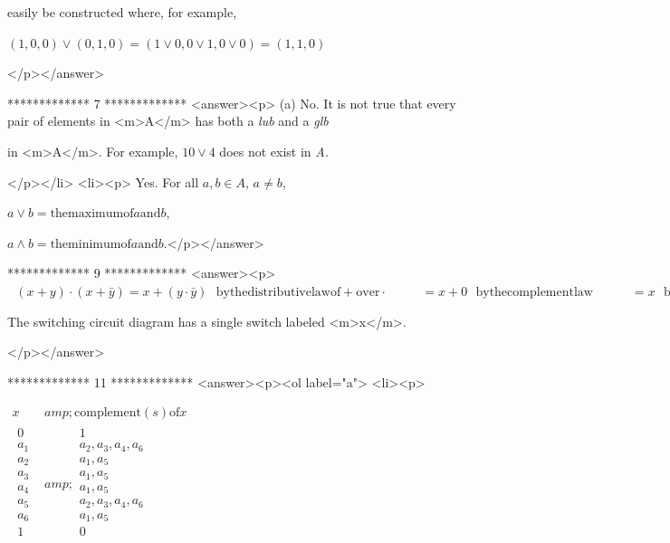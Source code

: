 easily be constructed where, for example,



 \((1, 0, 0) \lor  (0, 1, 0) = (1 \lor  0,0\lor 1,0\lor 0)=(1,1,0)\)

</p></answer>


*************
7
*************
<answer><p> (a) No. It is not true that every pair of elements in <m>A</m> has both a \textit{ lub} and a \textit{ glb}



in <m>A</m>.  For example, \(10 \lor  4\) does not exist in \textit{ A.}

</p></li>
<li><p>  Yes. For all \(a, b \in  A\), \(a \neq b\),



 \(a \lor  b = \text{the} \text{maximum} \text{of} a \text{and} b\),



 \(a \land  b = \text{the} \text{minimum} \text{of} a \text{and} b.\)</p></answer>


*************
9
*************
<answer><p> \(\text{            }(x + y) \cdot  \left(x + \bar{y}\right) =x + \left(y \cdot \bar{y}\right)\text{   }\text{by} \text{the} \text{distributive}
\text{law} \text{of} + \text{over} \cdot \text{$\quad \quad $        }= x + 0\text{          }\text{by} \text{the} \text{complement} \text{law}\quad
\quad \quad = x\text{                    }\text{by} \text{the} \text{identity} \text{law}\)



The switching circuit diagram has a single switch labeled <m>x</m>.

</p></answer>


*************
11
*************
<answer><p><ol label="a">
<li><p>



\(\begin{array}{c|c}
 x &amp; \text{complement}(s) \text{of} x \\
\hline
 
\begin{array}{c}
 0 \\
 a_1 \\
 a_2 \\
 a_3 \\
 a_4 \\
 a_5 \\
 a_6 \\
 1 \\
\end{array}
 &amp; 
\begin{array}{c}
 1 \\
 a_2,a_3,a_4,a_6 \\
 a_1,a_5 \\
 a_1,a_5 \\
 a_1,a_5 \\
 a_2,a_3,a_4,a_6 \\
 a_1,a_5 \\
 0 \\
\end{array}
 \\
\end{array}\)

